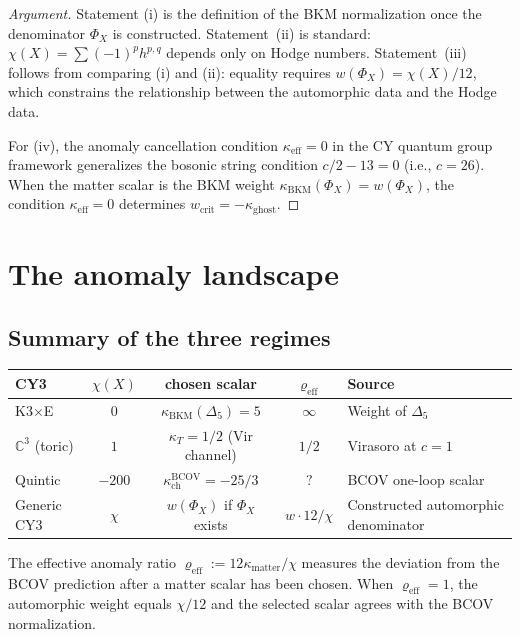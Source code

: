 \documentclass[11pt]{article}
\theoremstyle{definition}
\theoremstyle{remark}
\begin{document}
\begin{proof}[Argument]
Statement (i) is the definition of the BKM normalization once the
denominator $\Phi_X$ is constructed. Statement~(ii) is standard:
$\chi(X) = \sum (-1)^p h^{p,q}$ depends only on Hodge numbers.
Statement~(iii) follows from comparing (i) and (ii): equality requires
$w(\Phi_X) = \chi(X)/12$, which constrains the relationship between the
automorphic data and the Hodge data.

For (iv), the anomaly cancellation condition
$\kappa_{\mathrm{eff}} = 0$ in the CY quantum group framework
generalizes the bosonic string condition $c/2 - 13 = 0$ (i.e., $c = 26$).
When the matter scalar is the BKM weight
$\kappa_{\mathrm{BKM}}(\Phi_X)=w(\Phi_X)$, the condition
$\kappa_{\mathrm{eff}} = 0$ determines
$w_{\mathrm{crit}}=-\kappa_{\mathrm{ghost}}$.
\end{proof}


\section{The anomaly landscape}
\label{sec:synthesis}

\subsection{Summary of the three regimes}

\begin{center}
\renewcommand{\arraystretch}{1.4}
\begin{tabular}{lcccl}
\textbf{CY3} & $\chi(X)$ & \textbf{chosen scalar} & $\varrho_{\mathrm{eff}}$
 & \textbf{Source} \\ \hline
K3$\times$E & $0$ & $\kappa_{\mathrm{BKM}}(\Delta_5)=5$ & $\infty$
 & Weight of $\Delta_5$ \\
$\mathbb{C}^3$ (toric) & $1$ & $\kappa_T=1/2$ (Vir channel) & $1/2$
 & Virasoro at $c = 1$ \\
Quintic & $-200$ & $\kappa_{\mathrm{ch}}^{\mathrm{BCOV}}=-25/3$ & $?$ & BCOV one-loop scalar \\
Generic CY3 & $\chi$ & $w(\Phi_X)$ if $\Phi_X$ exists & $w \cdot 12/\chi$
 & Constructed automorphic denominator
\end{tabular}
\end{center}

The effective anomaly ratio
$\varrho_{\mathrm{eff}} := 12\kappa_{\mathrm{matter}}/\chi$
measures the deviation from the BCOV prediction after a matter scalar has
been chosen. When
$\varrho_{\mathrm{eff}} = 1$, the automorphic weight equals $\chi/12$
and the selected scalar agrees with the BCOV normalization.
\end{document}
